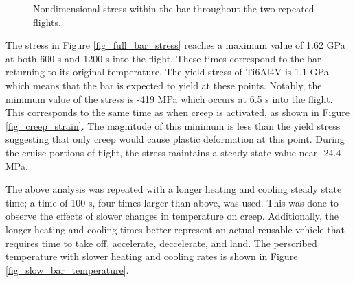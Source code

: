 \documentclass[conf]{new-aiaa}
\begin{document}
\begin{figure}[H]
  \centering
  \caption{ Nondimensional stress within the bar throughout the two repeated flights.}
  \label{fig_full_bar_nondim_stress}
\end{figure}

The stress in Figure \ref{fig_full_bar_stress} reaches a maximum value of 
1.62 GPa at both 600 s and 1200 s into the flight. 
These times correspond to the bar returning to its original temperature.
The yield stress of Ti6Al4V is 1.1 GPa 
\cite{boyer_materials_properties_handbook_titanium_alloys}
which means that the bar is expected to yield at these points.
Notably, the minimum value of the stress is -419 MPa 
which occurs at 6.5 s into the flight. 
This corresponds to the same time as when creep is activated,
as shown in Figure \ref{fig_creep_strain}.
The magnitude of this minimum is less than the yield 
stress suggesting that only creep would cause plastic deformation
at this point.
During the cruise portions of flight, the stress
maintains a steady state value near -24.4 MPa.

The above analysis was repeated with a longer heating and cooling 
steady state time;
a time of 100 s, four times larger than above, was used.
This was done to observe the effects of slower
changes in temperature on creep.
Additionally, the longer heating and cooling times
better represent an actual reusable vehicle that requires
time to take off, accelerate, deccelerate, and land.
The perscribed temperature with slower
heating and cooling rates is shown in Figure \ref{fig_slow_bar_temperature}.
\end{document}
